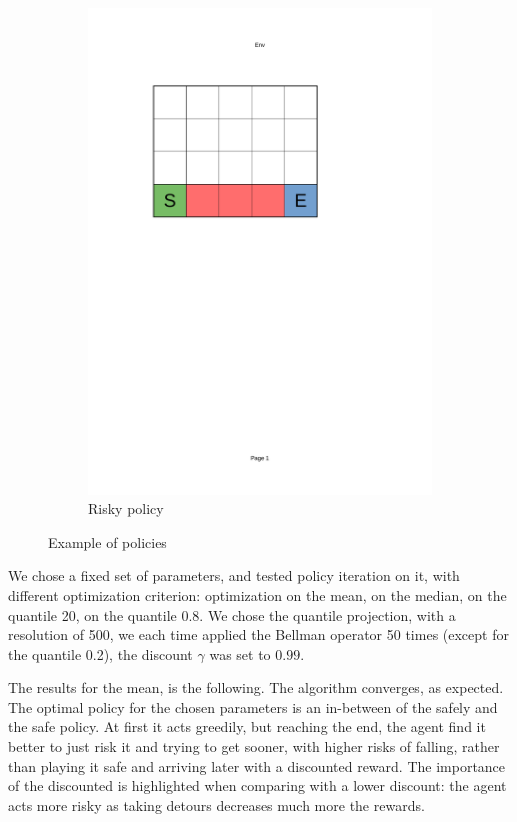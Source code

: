 \begin{figure}[!ht]
\begin{subfigure}{0.45\textwidth}
            \includegraphics[page=3, trim = 40mm 160mm 70mm 45mm, clip, height=0.2\textheight]{figures/personal_work/policies.pdf}
        \caption{Risky policy}
        \label{RiskyPolicy}
    \end{subfigure}
        \caption{Example of policies}
\end{figure}

We chose a fixed set of parameters, and tested policy iteration on it, with different optimization criterion: optimization on the mean, on the median, on the quantile 20, on the quantile 0.8. We chose the quantile projection, with a resolution of 500, we each time applied the Bellman operator 50 times (except for the quantile 0.2), the discount $\gamma$ was set to $0.99$.

The results for the mean, is the following. The algorithm converges, as expected. The optimal policy for the chosen parameters is an in-between of the safely and the safe policy. At first it acts greedily, but reaching the end, the agent find it better to just risk it and trying to get sooner, with higher risks of falling, rather than playing it safe and arriving later with a discounted reward. The importance of the discounted is highlighted when comparing with a lower discount: the agent acts more risky as taking detours decreases much more the rewards.

